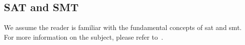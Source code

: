 \documentclass[runningheads]{llncs}
\begin{document}
\subsection{SAT and SMT}
We assume the reader is familiar with the fundamental concepts of \gls{sat} and \gls{smt}.
For more information on the subject, please refer to~\cite{ref:handbook-sat,paper:survey-smt}.

\end{document}
